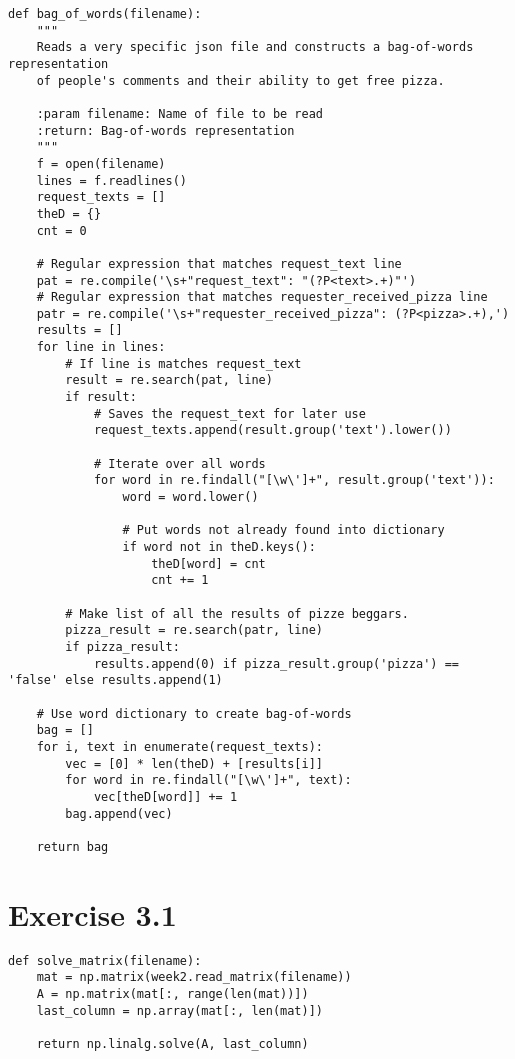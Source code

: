 \documentclass{article}
\begin{document}
\begin{lstlisting}
def bag_of_words(filename):
    """
    Reads a very specific json file and constructs a bag-of-words representation
    of people's comments and their ability to get free pizza.

    :param filename: Name of file to be read
    :return: Bag-of-words representation
    """
    f = open(filename)
    lines = f.readlines()
    request_texts = []
    theD = {}
    cnt = 0

    # Regular expression that matches request_text line
    pat = re.compile('\s+"request_text": "(?P<text>.+)"')
    # Regular expression that matches requester_received_pizza line
    patr = re.compile('\s+"requester_received_pizza": (?P<pizza>.+),')
    results = []
    for line in lines:
        # If line is matches request_text
        result = re.search(pat, line)
        if result:
            # Saves the request_text for later use
            request_texts.append(result.group('text').lower())

            # Iterate over all words
            for word in re.findall("[\w\']+", result.group('text')):
                word = word.lower()

                # Put words not already found into dictionary
                if word not in theD.keys():
                    theD[word] = cnt
                    cnt += 1

        # Make list of all the results of pizze beggars.
        pizza_result = re.search(patr, line)
        if pizza_result:
            results.append(0) if pizza_result.group('pizza') == 'false' else results.append(1)

    # Use word dictionary to create bag-of-words
    bag = []
    for i, text in enumerate(request_texts):
        vec = [0] * len(theD) + [results[i]]
        for word in re.findall("[\w\']+", text):
            vec[theD[word]] += 1
        bag.append(vec)

    return bag
\end{lstlisting}


\section{Exercise 3.1}

\begin{lstlisting}
def solve_matrix(filename):
    mat = np.matrix(week2.read_matrix(filename))
    A = np.matrix(mat[:, range(len(mat))])
    last_column = np.array(mat[:, len(mat)])

    return np.linalg.solve(A, last_column)
\end{lstlisting}
\end{document}
